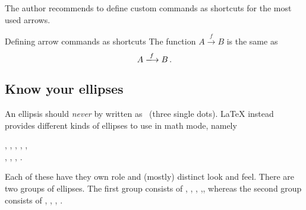 The author recommends to define custom commands as shortcuts for the most used arrows.
\begin{showlatex}{Defining arrow commands as shortcuts}
\newcommand{\xto}{\xrightarrow}
\newcommand{\xlongto}[1]{\xlongrightarrow{\;#1\;}}
The function $A \xto{f} B$ is the same as
\[
  A \xlongto{f} B \,.
\]
\end{showlatex}






\subsection{Know your ellipses}

An ellipsis should \emph{never} by written as~ (three single dots).
{\LaTeX} instead provides different kinds of ellipses to use in math mode, namely
\begin{center}
    ,
    \quad
    ,
    \quad
    ,
    \quad
    ,
    \quad
    ,
    \\
    ,
    \quad
    ,
    \quad
    ,
    \quad
    .
\end{center}
Each of these have they own role and (mostly) distinct look and feel.
There are two groups of ellipses.
The first group consists of , , , ,, whereas the second group consists of , , , .

